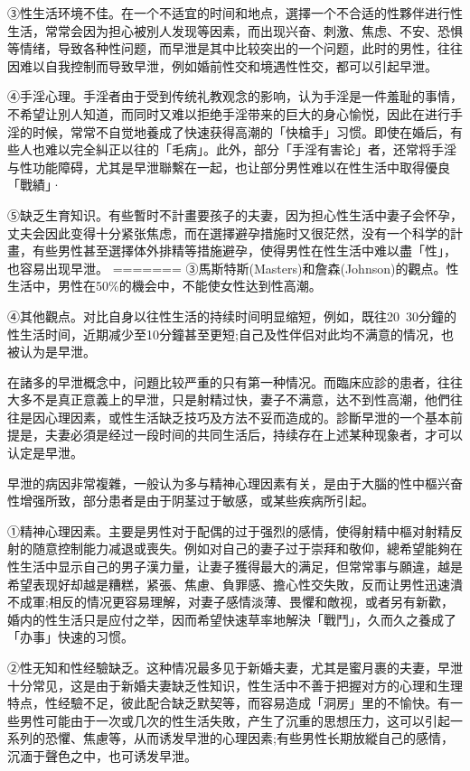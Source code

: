 \documentclass[12pt,UTF8]{ctexbook}
\begin{document}
③性生活环境不佳。在一个不适宜的时间和地点，選擇一个不合适的性夥伴进行性生活，常常会因为担心被別人发现等因素，而出现兴奋、刺激、焦虑、不安、恐惧等情绪，导致各种性问题，而早泄是其中比较突出的一个问题，此时的男性，往往因难以自我控制而导致早泄，例如婚前性交和境遇性性交，都可以引起早泄。

④手淫心理。手淫者由于受到传统礼教观念的影响，认为手淫是一件羞耻的事情，不希望让別人知道，而同时又难以拒绝手淫带来的巨大的身心愉悦，因此在进行手淫的时候，常常不自觉地養成了快速获得高潮的「快槍手」习惯。即使在婚后，有些人也难以完全糾正以往的「毛病」。此外，部分「手淫有害论」者，还常将手淫与性功能障碍，尤其是早泄聯繫在一起，也让部分男性难以在性生活中取得優良「戰績」·

⑤缺乏生育知识。有些暫时不計畫要孩子的夫妻，因为担心性生活中妻子会怀孕，丈夫会因此变得十分紧张焦虑，而在選擇避孕措施时又很茫然，没有一个科学的計畫，有些男性甚至選擇体外排精等措施避孕，使得男性在性生活中难以盡「性」，也容易出现早泄。
=======
③馬斯特斯(Masters)和詹森(Johnson)的觀点。性生活中，男性在50\%的機会中，不能使女性达到性高潮。

④其他觀点。对比自身以往性生活的持续时间明显缩短，例如，既往20~30分鐘的性生活时间，近期减少至10分鐘甚至更短;自己及性伴侣对此均不满意的情况，也被认为是早泄。

在諸多的早泄概念中，问題比较严重的只有第一种情况。而臨床应診的患者，往往大多不是真正意義上的早泄，只是射精过快，妻子不满意，达不到性高潮，他們往往是因心理因素，或性生活缺乏技巧及方法不妥而造成的。診斷早泄的一个基本前提是，夫妻必須是经过一段时间的共同生活后，持续存在上述某种现象者，才可以认定是早泄。

早泄的病因非常複雜，一般认为多与精神心理因素有关，是由于大腦的性中樞兴奋性增强所致，部分患者是由于阴茎过于敏感，或某些疾病所引起。

①精神心理因素。主要是男性对于配偶的过于强烈的感情，使得射精中樞对射精反射的随意控制能力减退或喪失。例如对自己的妻子过于崇拜和敬仰，總希望能夠在性生活中显示自己的男子漢力量，让妻子獲得最大的满足，但常常事与願違，越是希望表现好却越是糟糕，紧張、焦慮、負罪感、擔心性交失敗，反而让男性迅速潰不成軍;相反的情况更容易理解，对妻子感情淡薄、畏懼和敵视，或者另有新歡，婚内的性生活只是应付之举，因而希望快速草率地解決「戰鬥」，久而久之養成了「办事」快速的习惯。

②性无知和性经驗缺乏。这种情况最多见于新婚夫妻，尤其是蜜月裹的夫妻，早泄十分常见，这是由于新婚夫妻缺乏性知识，性生活中不善于把握对方的心理和生理特点，性经驗不足，彼此配合缺乏默契等，而容易造成「洞房」里的不愉快。有一些男性可能由于一次或几次的性生活失敗，产生了沉重的思想压力，这可以引起一系列的恐懼、焦慮等，从而诱发早泄的心理因素;有些男性长期放縱自己的感情，沉湎于聲色之中，也可诱发早泄。
\end{document}
